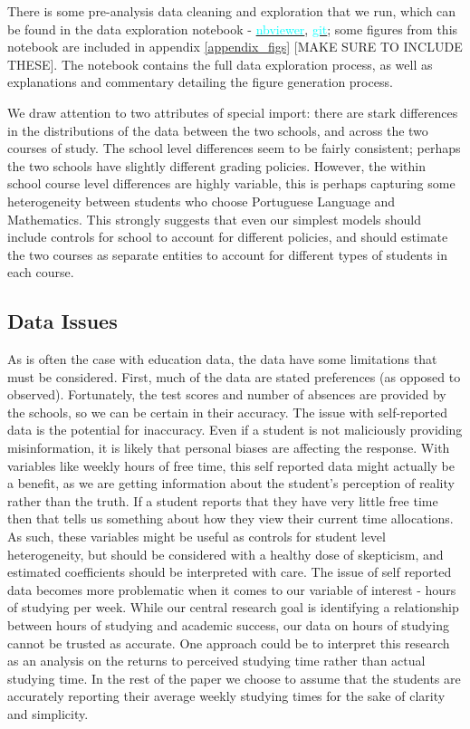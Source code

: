 \documentclass[12pt]{article}
\begin{document}
There is some pre-analysis data cleaning and exploration that we run, which can be found in the data exploration notebook - \href{https://nbviewer.jupyter.org/github/nadavtadelis/Reproducible_Metrics/blob/master/data_exploration.ipynb}{\textcolor{cyan}{nbviewer}}, \href{https://github.com/nadavtadelis/Reproducible_Metrics/blob/master/data_exploration.ipynb}{\textcolor{cyan}{git}}; some figures from this notebook are included in appendix \ref{appendix_figs} \textcolor{BrickRed}{[MAKE SURE TO INCLUDE THESE]}. The notebook contains the full data exploration process, as well as explanations and commentary detailing the figure generation process.

We draw attention to two attributes of special import: there are stark differences in the distributions of the data between the two schools, and across the two courses of study. The school level differences seem to be fairly consistent; perhaps the two schools have slightly different grading policies. However, the within school course level differences are highly variable, this is perhaps capturing some heterogeneity between students who choose Portuguese Language and Mathematics. This strongly suggests that even our simplest models should include controls for school to account for different policies, and should estimate the two courses as separate entities to account for different types of students in each course.


\subsection{Data Issues} \label{data_issues}
As is often the case with education data, the data have some limitations that must be considered. First, much of the data are stated preferences (as opposed to observed). Fortunately, the test scores and number of absences are provided by the schools, so we can be certain in their accuracy. The issue with self-reported data is the potential for inaccuracy. Even if a student is not maliciously providing misinformation, it is likely that personal biases are affecting the response. With variables like weekly hours of free time, this self reported data might actually be a benefit, as we are getting information about the student's perception of reality rather than the truth. If a student reports that they have very little free time then that tells us something about how they view their current time allocations. As such, these variables might be useful as controls for student level heterogeneity, but should be considered with a healthy dose of skepticism, and estimated coefficients should be interpreted with care. The issue of self reported data becomes more problematic when it comes to our variable of interest - hours of studying per week. While our central research goal is identifying a relationship between hours of studying and academic success, our data on hours of studying cannot be trusted as accurate. One approach could be to interpret this research as an analysis on the returns to perceived studying time rather than actual studying time. In the rest of the paper we choose to assume that the students are accurately reporting their average weekly studying times for the sake of clarity and simplicity.
\end{document}

